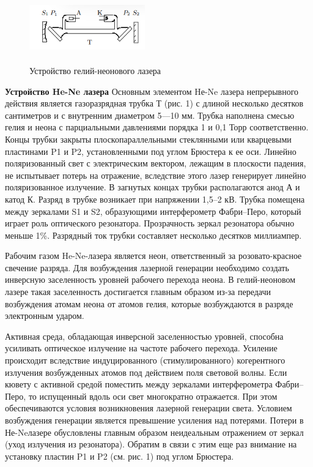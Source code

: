 \documentclass[12pt,a4paper]{article}
\begin{document}
\begin{figure}
	\vspace{-4ex}
	\includegraphics[width=5cm, height=3cm]{4.5.3-1}
	\caption{Устройство гелий-неонового лазера}
\end{figure}	 

\par \textbf{Устройство He-Ne лазера} Основным элементом Hе-Ne лазера непрерывного действия является газоразрядная трубка Т (рис. 1) с длиной несколько десятков сантиметров и с внутренним диаметром 5—10 мм. Трубка наполнена смесью гелия и неона с парциальными давлениями порядка 1 и 0,1 Торр соответственно. Концы трубки закрыты плоскопараллельными стеклянными или кварцевыми пластинами P1 и P2, установленными под углом Брюстера к ее оси. Линейно поляризованный свет с электрическим вектором, лежащим в плоскости падения, не испытывает потерь на
отражение, вследствие этого лазер генерирует линейно поляризованное излучение. В загнутых концах трубки располагаются анод А и катод К. Разряд в трубке возникает при напряжении 1,5–2 кВ. Трубка помещена между зеркалами S1 и S2, образующими интерферометр Фабри–Перо, который играет роль оптического резонатора. Прозрачность зеркал резонатора обычно меньше 1\%. Разрядный ток трубки составляет несколько десятков миллиампер.

\par Рабочим газом He-Ne-лазера является неон, ответственный за розовато-красное свечение разряда. Для возбуждения лазерной генерации необходимо создать инверсную заселенность уровней рабочего перехода неона. В гелий-неоновом лазере такая заселенность достигается главным образом из-за передачи возбуждения атомам неона от атомов гелия, которые возбуждаются в разряде электронным ударом.

\par Активная среда, обладающая инверсной заселенностью уровней, способна усиливать оптическое излучение на частоте рабочего перехода. Усиление происходит вследствие индуцированного (стимулированного) когерентного излучения возбужденных атомов под действием поля световой волны. Если кювету с активной средой поместить между зеркалами интерферометра Фабри–Перо, то испущенный вдоль
оси свет многократно отражается. При этом обеспечиваются условия возникновения лазерной генерации света. Условием возбуждения генерации является превышение усиления над потерями. Потери в Не-Neлазере обусловлены главным образом неидеальным отражением от зеркал (уход излучения из резонатора). Обратим в связи с этим еще раз внимание на установку пластин P1 и P2 (см. рис. 1) под углом Брюстера.
\end{document}
